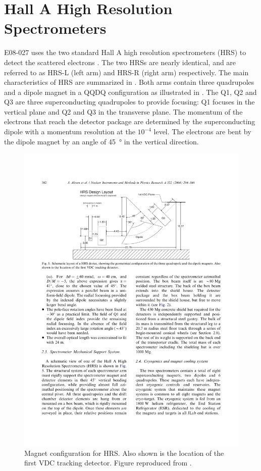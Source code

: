 \section{Hall A High Resolution Spectrometers}
\label{C5S4}

E08-027 uses the two standard Hall A high resolution spectrometers (HRS) to detect the scattered electrons \cite{Alcorn2004}. The two HRSs are nearly identical, and are referred to as HRS-L (left arm) and HRS-R (right arm) respectively. The main characteristics of HRS are summarized in . Both arms contain three quadrupoles and a dipole magnet in a QQDQ configuration as illustrated in . The Q1, Q2 and Q3 are three superconducting quadrupoles to provide focusing: Q1 focuses in the vertical plane and Q2 and Q3 in the transverse plane. The momentum of the electrons that reach the detector package are determined by the superconducting dipole with a momentum resolution at the $10^{-4}$ level. The electrons are bent by the dipole magnet by an angle of \SI{45}{\degree} in the vertical direction.

\begin{figure}[p!]
  \centering
  \includegraphics[width=\textwidth]{figs/HRS.pdf}
  \caption[Magnet configuration for HRS.]{Magnet configuration for HRS. Also shown is the location of the first VDC tracking detector. Figure reproduced from \cite{Alcorn2004}. \label{C5S4F1}}
\end{figure}

